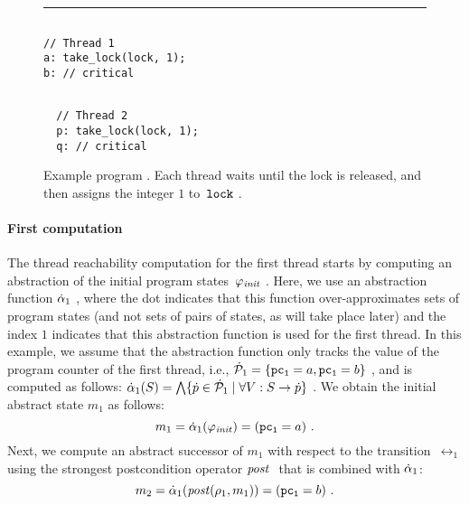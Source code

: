 \begin{figure}[h!]
\hrule
\centering
\begin{minipage}[t]{.48\columnwidth} 
\begin{verbatim} 

// Thread 1 
a: take_lock(lock, 1); 
b: // critical 
\end{verbatim}
\end{minipage}
%
\begin{minipage}[t]{.48\columnwidth} 
\begin{verbatim}

  // Thread 2
  p: take_lock(lock, 1);
  q: // critical

\end{verbatim}
\end{minipage}
\caption{Example program \TakeLockBit.
  Each thread waits until the lock is released, and then assigns the
integer $1$ to~$\mathtt{lock}\ $.
}
\label{fig-take-lock}
\end{figure}


\paragraph{First \aret computation}


The thread reachability computation for the first thread starts by
computing an abstraction of the initial program states~$\varphi_{\mathit{init}}\ $.
Here, we use an abstraction function $\dot{\alpha}_1\ $, where the dot
indicates that this function over-approximates sets of program states
(and not sets of pairs of states, as will take place later) and the
index $1$ indicates that this abstraction function is used for the
first thread.
In this example, we assume that the abstraction function only tracks
the value of the program counter of the first thread, i.e.,
$\dot{\mathcal{P}}_1 = \{\mathtt{pc_1}=a, \mathtt{pc_1}=b\}\ $, and is computed as
follows: $\dot{\alpha}_1(S) = \bigwedge \{\dot{p} \in \dot{\mathcal{P}}_1 \mid \forall
V:S \rightarrow \dot{p}\}\ $.
We obtain the initial abstract state $m_1$ as follows:
%
\begin{equation*}
  m_1  = \dot{\alpha}_1(\varphi_{\mathit{init}}) = (\mathtt{pc_1} = a)\ .
\end{equation*}
%
 Next, we compute an abstract successor of $m_1$ with respect to the
transition~$\rel_1$ using the strongest postcondition operator $\mathit{post}\
$ that is combined with $\dot{\alpha}_{1}$:
%
\begin{equation*}
  m_2 = \abst_1(\post(\rel_1, m_1)) = (\pcone = b)\ .
\end{equation*}

